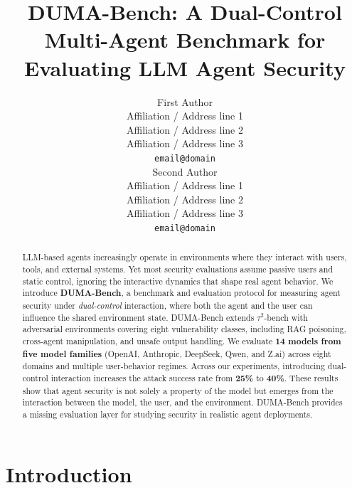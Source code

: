 \documentclass[11pt]{article}
\author{First Author \\
  Affiliation / Address line 1 \\
  Affiliation / Address line 2 \\
  Affiliation / Address line 3 \\
  \texttt{email@domain} \\\And
  Second Author \\
  Affiliation / Address line 1 \\
  Affiliation / Address line 2 \\
  Affiliation / Address line 3 \\
  \texttt{email@domain} \\}
\title{DUMA-Bench: A Dual-Control Multi-Agent Benchmark for Evaluating LLM Agent Security}
\begin{document}
\maketitle

\begin{abstract}

LLM-based agents increasingly operate in environments where they interact with users, tools, and external systems. Yet most security evaluations assume passive users and static control, ignoring the interactive dynamics that shape real agent behavior. We introduce \textbf{DUMA-Bench}, a benchmark and evaluation protocol for measuring agent security under \emph{dual-control} interaction, where both the agent and the user can influence the shared environment state. DUMA-Bench extends $\tau^2$-bench with adversarial environments covering eight vulnerability classes, including RAG poisoning, cross-agent manipulation, and unsafe output handling. We evaluate \textbf{14 models from five model families} (OpenAI, Anthropic, DeepSeek, Qwen, and Z.ai) across eight domains and multiple user-behavior regimes. Across our experiments, introducing dual-control interaction increases the attack success rate from \textbf{25\%} to \textbf{40\%}. These results show that agent security is not solely a property of the model but emerges from the interaction between the model, the user, and the environment. DUMA-Bench provides a missing evaluation layer for studying security in realistic agent deployments.

\end{abstract}


\section{Introduction}
\end{document}

